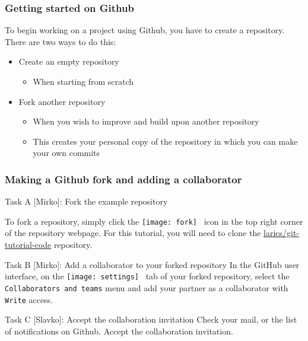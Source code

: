\begin{frame}

\frametitle{Getting started on Github}

To begin working on a project using Github, you have to create a repository. There are two ways to do this:


\begin{itemize}
	\item Create an empty repository
	\begin{itemize}
	\item When starting from scratch
	\end{itemize}	
	
	\medskip
	\item Fork another repository
	\begin{itemize}
	\item When you wish to improve and build upon another repository
	\item This creates your personal copy of the repository in which you can make your own commits
	\end{itemize}
\end{itemize}

\end{frame}


\begin{frame}[fragile]

\frametitle{Making a Github fork and adding a collaborator}

\begin{block}{Task A [Mirko]: Fork the example repository}

	To fork a repository, simply click the \texttt{[image: fork]} \, icon in the top right corner of the repository webpage. For this tutorial, you will need to clone the \href{https://github.com/larics/git-tutorial-code.git}{larics/git-tutorial-code} repository.
\end{block}

\begin{block}{Task B [Mirko]: Add a collaborator to your forked repository}
In the GitHub user interface, on the \texttt{[image: settings]} \, tab of your forked repository, select the \texttt{Collaborators and teams} menu and add your partner as a collaborator with \texttt{Write} access.
\end{block}

\begin{block}{Task C [Slavko]: Accept the collaboration invitation}
Check your mail, or the list of notifications on Github. Accept the collaboration invitation.
\end{block}

\end{frame}

